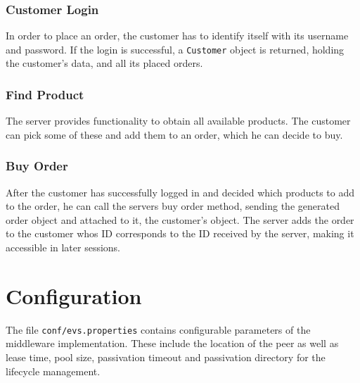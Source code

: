 \documentclass[a4paper]{article}
\begin{document}
\subsubsection{Customer Login}
In order to place an order, the customer has to identify itself with its username and password. If the login is successful, a \texttt{Customer} object is returned, holding the customer's data, and all its placed orders.

\subsubsection{Find Product}
The server provides functionality to obtain all available products. The customer can pick some of these and add them to an order, which he can decide to buy.

\subsubsection{Buy Order}
After the customer has successfully logged in and decided which products to add to the order, he can call the servers buy order method, sending the generated order object and attached to it, the customer's object. The server adds the order to the customer whos ID corresponds to the ID received by the server, making it accessible in later sessions.



\section{Configuration}
The file \texttt{conf/evs.properties} contains configurable parameters of the middleware implementation. These include the location of the peer as well as lease time, pool size, passivation timeout and passivation directory for the lifecycle management.

\clearpage
\end{document}
